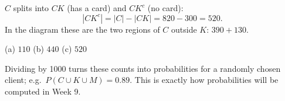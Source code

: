 \begin{solution}
	 $C$ splits into $CK$ (has a card) and $CK^c$ (no card):
	\[ |CK^c|=|C|-|CK|=820-300=520. \]
	In the diagram these are the two regions of $C$ outside $K$: $390+130$.
	\begin{answer}
		(a) $110$ \quad (b) $440$ \quad (c) $520$
	\end{answer}
	\begin{remark}
		Dividing by 1000 turns these counts into probabilities for a randomly
		chosen client; e.g.\ $P(C\cup K\cup M)=0.89$. This is exactly how
		probabilities will be computed in Week 9.
	\end{remark}
\end{solution}
